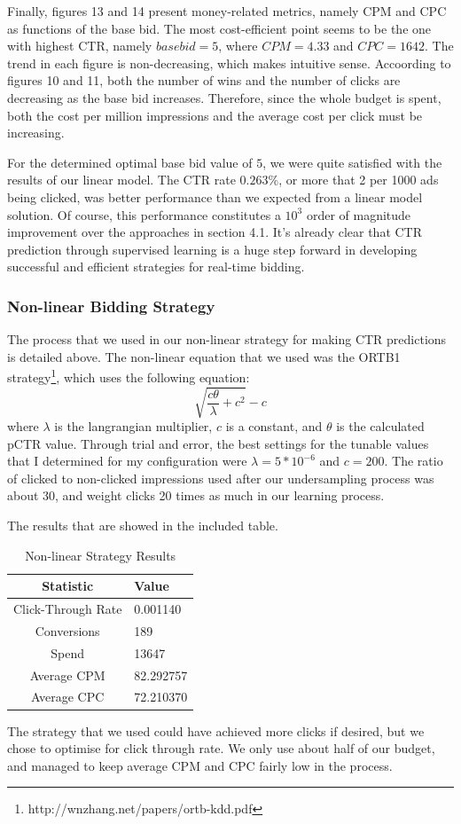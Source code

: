 \documentclass{sig-alternate-05-2015}
\begin{document}
Finally, figures 13 and 14 present money-related metrics, namely CPM and CPC as functions of the base bid. The most cost-efficient point seems to be the one with highest CTR, namely $base bid = 5$, where $CPM = 4.33$ and $CPC = 1642$. The trend in each figure is non-decreasing, which makes intuitive sense. Accoording to figures 10 and 11, both the number of wins and the number of clicks are decreasing as the base bid increases. Therefore, since the whole budget is spent, both the cost per million impressions and the average cost per click must be increasing.

For the determined optimal base bid value of $5$, we were quite satisfied with the results of our linear model. The CTR rate $0.263\%$, or more that 2 per 1000 ads being clicked, was better performance than we expected from a linear model solution. Of course, this performance constitutes a $10^3$ order of magnitude improvement over the approaches in section 4.1. It's already clear that CTR prediction through supervised learning is a huge step forward in developing successful and efficient strategies for real-time bidding.

\subsubsection{Non-linear Bidding Strategy}

The process that we used in our non-linear strategy for making CTR predictions is detailed above. The non-linear equation that we used was the ORTB1 strategy\footnote{http://wnzhang.net/papers/ortb-kdd.pdf}, which uses the following equation:
\begin{equation}\sqrt{\frac{c\theta}{\lambda}+c^2}-c\end{equation}
where $\lambda$ is the langrangian multiplier, $c$ is a constant, and $\theta$ is
the calculated pCTR value. Through trial and error, the best settings for the tunable values that I determined for my configuration were $\lambda=5*10^{-6}$ and
$c=200$. The ratio of clicked to non-clicked impressions used after our undersampling process was about 30,
and weight clicks 20 times as much in our learning process.

The results that are showed in the included table.
\begin{table}
\centering
\caption{Non-linear Strategy Results}
\begin{tabular}{|c|l|} \hline
\textbf{Statistic}&\textbf{Value}\\ \hline
Click-Through Rate&0.001140\\ \hline
Conversions&189\\ \hline
Spend&13647\\ \hline
Average CPM&82.292757\\ \hline
Average CPC&72.210370\\
\hline\end{tabular}
\end{table}
The strategy that we used could have achieved more clicks if desired, but we chose to optimise for click through rate. We only
use about half of our budget, and managed to keep average CPM and CPC fairly low in the process.
\end{document}

